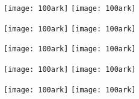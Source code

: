 

\geometry{verbose,a4paper, inner=1cm, outer=1 cm, bmargin=2cm, tmargin=1cm}

\pagestyle{empty}
\begin{center}
	\texttt{[image: 100ark]} \qquad \qquad
	\texttt{[image: 100ark]}
\end{center}
\begin{center}
	\texttt{[image: 100ark]} \qquad \qquad
	\texttt{[image: 100ark]}
\end{center}
\begin{center}
	\texttt{[image: 100ark]} \qquad \qquad
	\texttt{[image: 100ark]}
\end{center}
\begin{center}
	\texttt{[image: 100ark]} \qquad \qquad
	\texttt{[image: 100ark]}
\end{center}
\begin{center}
	\texttt{[image: 100ark]} \qquad \qquad
	\texttt{[image: 100ark]}
\end{center}

